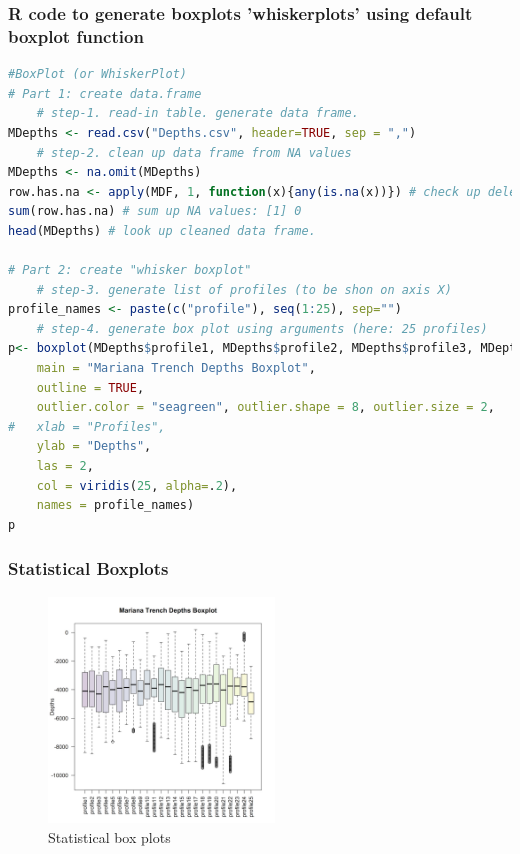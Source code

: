 \documentclass[pdflatex,compress,10pt,
	xcolor={dvipsnames,dvipsnames,svgnames,x11names,table},
	hyperref={colorlinks = true,breaklinks = true, urlcolor = NavyBlue, breaklinks = true}]{beamer}
\begin{document}
\begin{frame}[fragile]\frametitle{R code to generate boxplots 'whiskerplots' using default boxplot function}
\begin{lstlisting}[language=R]
#BoxPlot (or WhiskerPlot)
# Part 1: create data.frame
	# step-1. read-in table. generate data frame.
MDepths <- read.csv("Depths.csv", header=TRUE, sep = ",")
	# step-2. clean up data frame from NA values
MDepths <- na.omit(MDepths) 
row.has.na <- apply(MDF, 1, function(x){any(is.na(x))}) # check up deleted NA
sum(row.has.na) # sum up NA values: [1] 0
head(MDepths) # look up cleaned data frame.

# Part 2: create "whisker boxplot"
	# step-3. generate list of profiles (to be shon on axis X)
profile_names <- paste(c("profile"), seq(1:25), sep="") 
	# step-4. generate box plot using arguments (here: 25 profiles)
p<- boxplot(MDepths$profile1, MDepths$profile2, MDepths$profile3, MDepths$profile4, MDepths$profile5, MDepths$profile6,MDepths$profile7, MDepths$profile8, MDepths$profile9, MDepths$profile10, MDepths$profile11, MDepths$profile12, MDepths$profile13, MDepths$profile14, MDepths$profile15, MDepths$profile16, MDepths$profile17, MDepths$profile18, MDepths$profile19, MDepths$profile20, MDepths$profile21, MDepths$profile22, MDepths$profile23, MDepths$profile24, MDepths$profile25,     
	main = "Mariana Trench Depths Boxplot", 
	outline = TRUE,
	outlier.color = "seagreen", outlier.shape = 8, outlier.size = 2,    
#	xlab = "Profiles",         
	ylab = "Depths",         
	las = 2,         
	col = viridis(25, alpha=.2),         
	names = profile_names)
p
\end{lstlisting}
\end{frame}

\begin{frame}\frametitle{Statistical Boxplots}
\begin{figure}[H]
	\centering
		\includegraphics[width=6cm]{Fig-2-6.jpg}
	\caption{Statistical box plots}
\end{figure}		
\end{frame}
\end{document}
